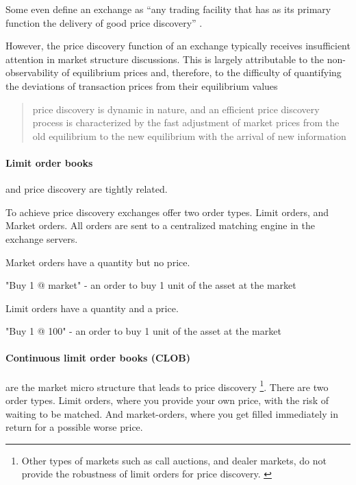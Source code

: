 \documentclass[12pt]{article}
\begin{document}
Some even define an exchange as ``any trading facility that has as its primary function the delivery of good price discovery'' \cite{francioni_schwartz_2017}. 

However, the price discovery function of an  exchange typically receives insufficient attention in market structure discussions. This is largely attributable to the non-observability of equilibrium prices and, therefore, to the difficulty of quantifying the deviations of transaction prices from their equilibrium values \cite{francioni_schwartz_2017}


\begin{quote}
    price discovery is dynamic in nature, and an efficient price discovery process is characterized by the fast adjustment of market prices from the old equilibrium to the new equilibrium with the arrival of new information \cite{RePEc:udb:wpaper:uwec-2005-01-r}    
\end{quote}

\paragraph*{Limit order books} and price discovery are tightly related. \citep{RePEc:nbr:nberwo:6257} \cite{RePEc:eee:jfinec:v:17:y:1986:i:1:p:5-26}

To achieve price discovery exchanges offer two order types. Limit orders, and Market orders. All orders are sent to a centralized matching engine in the exchange servers. 

Market orders have a quantity but no price. 

\begin{enumerate*}
    \item "Buy 1 @ market" - an order to buy 1 unit of the asset at the market  
\end{enumerate*}

Limit orders have a quantity and a price. 

\begin{enumerate*}
    \item "Buy 1 @ 100" - an order to buy 1 unit of the asset at the market  
\end{enumerate*}


\paragraph*{Continuous limit order books (CLOB)} are the market micro structure that leads to price discovery \footnote{Other types of markets such as call auctions, and dealer markets, do not provide the robustness of limit orders for price discovery. \cite{RePEc:hal:journl:hal-00459785}}. There are two order types. Limit orders, where you provide your own price, with the risk of waiting to be matched. And market-orders, where you get filled immediately in return for a possible worse price.
\end{document}

